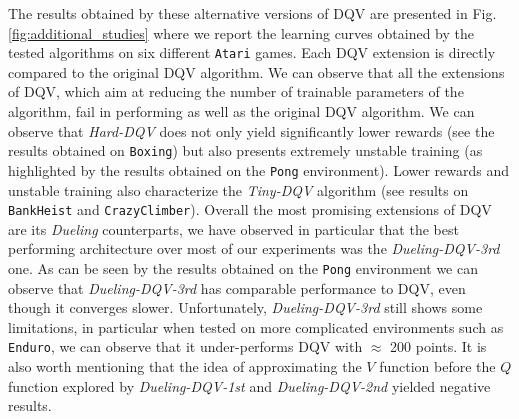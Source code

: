 The results obtained by these alternative versions of DQV are presented in Fig. \ref{fig:additional_studies} where we report the learning curves obtained by the tested algorithms on six different \texttt{Atari} games. Each DQV extension is directly compared to the original DQV algorithm. We can observe that all the extensions of DQV, which aim at reducing the number of trainable parameters of the algorithm, fail in performing as well as the original DQV algorithm. We can observe that \textit{Hard-DQV} does not only yield significantly lower rewards (see the results obtained on \texttt{Boxing}) but also presents extremely unstable training (as highlighted by the results obtained on the \texttt{Pong} environment). Lower rewards and unstable training also characterize the \textit{Tiny-DQV} algorithm (see results on \texttt{BankHeist} and \texttt{CrazyClimber}). Overall the most promising extensions of DQV are its \textit{Dueling} counterparts, we have observed in particular that the best performing architecture over most of our experiments was the \textit{Dueling-DQV-3rd} one. As can be seen by the results obtained on the \texttt{Pong} environment we can observe that \textit{Dueling-DQV-3rd} has comparable performance to DQV, even though it converges slower. Unfortunately, \textit{Dueling-DQV-3rd} still shows some limitations, in particular when tested on more complicated environments such as \texttt{Enduro}, we can observe that it under-performs DQV with $\approx$ 200 points. It is also worth mentioning that the idea of approximating the $V$ function before the $Q$ function explored by \textit{Dueling-DQV-1st} and \textit{Dueling-DQV-2nd} yielded negative results.







